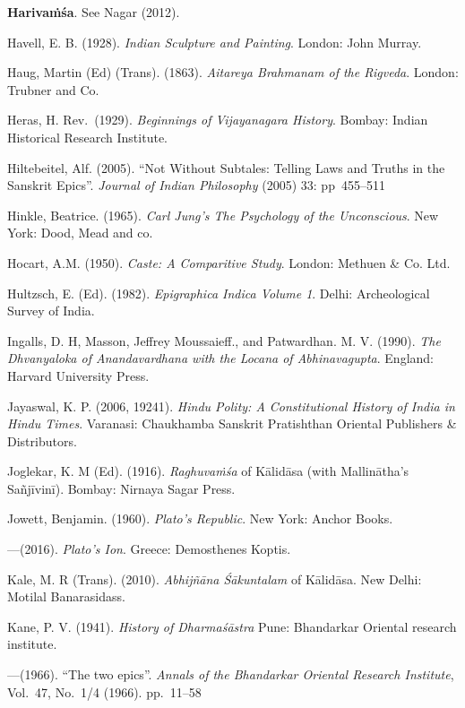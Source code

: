 \begin{thebibliography}{99}
{\bf Harivaṁśa}. See Nagar (2012). 

Havell, E. B. (1928). {\sl Indian Sculpture and Painting}. London: John Murray. 

Haug, Martin (Ed) (Trans). (1863). {\sl Aitareya Brahmanam of the Rigveda}. London: Trubner and Co. 

Heras, H. Rev.\ (1929). {\sl Beginnings of Vijayanagara History}. Bombay: Indian Historical Research Institute. 

Hiltebeitel, Alf. (2005). “Not Without Subtales: Telling Laws and Truths in the Sanskrit Epics”. {\sl Journal 
of Indian Philosophy} (2005) 33: pp~455--511

Hinkle, Beatrice. (1965). {\sl Carl Jung’s The Psychology of the Unconscious}. New York: Dood, Mead and co. 

Hocart, A.M. (1950). {\sl Caste: A Comparitive Study}. London: Methuen \& Co. Ltd. 

Hultzsch, E. (Ed). (1982). {\sl Epigraphica Indica Volume 1}. Delhi: Archeological Survey of India. 

Ingalls, D. H,  Masson, Jeffrey Moussaieff., and Patwardhan. M. V. (1990). {\sl The Dhvanyaloka of 
Anandavardhana with the Locana of Abhinavagupta}. England: Harvard University Press. 

Jayaswal, K. P. (2006, 19241). {\sl Hindu Polity: A Constitutional History of India in Hindu Times}. Varanasi: Chaukhamba Sanskrit Pratishthan Oriental Publishers \& Distributors. 

Joglekar, K. M (Ed). (1916). {\sl Raghuvaṁśa} of Kālidāsa (with Mallinātha’s Sañjīvinī). Bombay: Nirnaya Sagar Press.  

Jowett, Benjamin. (1960). {\sl Plato’s Republic}. New York: Anchor Books. 

---\kern3pt(2016). {\sl Plato’s Ion}. Greece: Demosthenes Koptis. 

Kale, M. R (Trans). (2010). {\sl Abhijñāna Śākuntalam} of Kālidāsa. New Delhi: Motilal Banarasidass. 

Kane, P. V. (1941). {\sl History of Dharmaśāstra} Pune: Bhandarkar Oriental research institute. 

---\kern3pt(1966). “The two epics”. {\sl Annals of the Bhandarkar Oriental Research Institute}, Vol.~47, No.~1/4 (1966). pp.~11--58 


\end{thebibliography}
